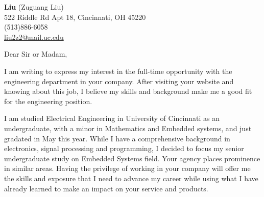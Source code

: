 \documentclass[11pt]{letter} %
\begin{document}

\begin{letter}
    {\vspace{-15pt}}


    \begin{center}
        \large \textbf{Liu} (Zuguang Liu) \\ %
        522 Riddle Rd Apt 18, Cincinnati, OH 45220 \\ (513)886-6058  \\ \href{mailto:liu2z2@mail.uc.edu}{liu2z2@mail.uc.edu}%
    \end{center}


    \signature{Liu (Zuguang Liu)} %


    \opening{Dear Sir or Madam,}

    \par I am writing to express my interest in the full-time opportunity with the engineering department in your company.
    After visiting your website and knowing about this job, I believe my skills and background make me a good fit for the engineering position.

    \par I am studied Electrical Engineering in University of Cincinnati as an undergraduate, with a minor in Mathematics and Embedded systems, and just gradated in May this year.
    While I have a comprehensive background in electronics, signal processing and programming, I decided to focus my senior undergraduate study on Embedded Systems field.
    Your agency places prominence in similar areas.
    Having the privilege of working in your company will offer me the skills and exposure that I need to advance my career while using what I have already learned to make an impact on your service and products.



\end{letter}
\end{document}
